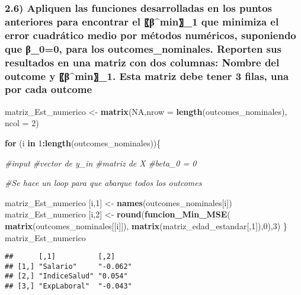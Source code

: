 \documentclass[
]{article}
\newenvironment{Shaded}{\begin{snugshade}}{\end{snugshade}}
\newcommand{\AttributeTok}[1]{\textcolor[rgb]{0.13,0.29,0.53}{#1}}
\newcommand{\CommentTok}[1]{\textcolor[rgb]{0.56,0.35,0.01}{\textit{#1}}}
\newcommand{\ConstantTok}[1]{\textcolor[rgb]{0.56,0.35,0.01}{#1}}
\newcommand{\ControlFlowTok}[1]{\textcolor[rgb]{0.13,0.29,0.53}{\textbf{#1}}}
\newcommand{\DecValTok}[1]{\textcolor[rgb]{0.00,0.00,0.81}{#1}}
\newcommand{\FunctionTok}[1]{\textcolor[rgb]{0.13,0.29,0.53}{\textbf{#1}}}
\newcommand{\NormalTok}[1]{#1}
\newcommand{\OtherTok}[1]{\textcolor[rgb]{0.56,0.35,0.01}{#1}}
\newcommand{\SpecialCharTok}[1]{\textcolor[rgb]{0.81,0.36,0.00}{\textbf{#1}}}
\begin{document}
\hypertarget{apliquen-las-funciones-desarrolladas-en-los-puntos-anteriores-para-encontrar-el-ux3b2min_1-que-minimiza-el-error-cuadruxe1tico-medio-por-muxe9todos-numuxe9ricos-suponiendo-que-ux3b2_00-para-los-outcomes_nominales.-reporten-sus-resultados-en-una-matriz-con-dos-columnas-nombre-del-outcome-y-ux3b2min_1.-esta-matriz-debe-tener-3-filas-una-por-cada-outcome}{%
\subsubsection{2.6) Apliquen las funciones desarrolladas en los puntos
anteriores para encontrar el 〖β\^{}min〗\_1 que minimiza el error
cuadrático medio por métodos numéricos, suponiendo que β\_0=0, para los
outcomes\_nominales. Reporten sus resultados en una matriz con dos
columnas: Nombre del outcome y 〖β\^{}min〗\_1. Esta matriz debe tener 3
filas, una por cada
outcome}\label{apliquen-las-funciones-desarrolladas-en-los-puntos-anteriores-para-encontrar-el-ux3b2min_1-que-minimiza-el-error-cuadruxe1tico-medio-por-muxe9todos-numuxe9ricos-suponiendo-que-ux3b2_00-para-los-outcomes_nominales.-reporten-sus-resultados-en-una-matriz-con-dos-columnas-nombre-del-outcome-y-ux3b2min_1.-esta-matriz-debe-tener-3-filas-una-por-cada-outcome}}

\begin{Shaded}
\begin{Highlighting}[]
\NormalTok{matriz\_Est\_numerico }\OtherTok{\textless{}{-}} \FunctionTok{matrix}\NormalTok{(}\ConstantTok{NA}\NormalTok{,}\AttributeTok{nrow =} \FunctionTok{length}\NormalTok{(outcomes\_nominales),}
                                 \AttributeTok{ncol =} \DecValTok{2}\NormalTok{)}

\ControlFlowTok{for}\NormalTok{ (i }\ControlFlowTok{in} \DecValTok{1}\SpecialCharTok{:}\FunctionTok{length}\NormalTok{(outcomes\_nominales))\{}
  
  \CommentTok{\#input}
    \CommentTok{\#vector de y\_in}
    \CommentTok{\#matriz de X}
    \CommentTok{\#beta\_0 = 0}
  
  \CommentTok{\#Se hace un loop para que abarque todos los outcomes}
  
\NormalTok{  matriz\_Est\_numerico [i,}\DecValTok{1}\NormalTok{] }\OtherTok{\textless{}{-}} \FunctionTok{names}\NormalTok{(outcomes\_nominales[i])}
\NormalTok{  matriz\_Est\_numerico [i,}\DecValTok{2}\NormalTok{] }\OtherTok{\textless{}{-}} \FunctionTok{round}\NormalTok{(}\FunctionTok{funcion\_Min\_MSE}\NormalTok{(}
                                \FunctionTok{matrix}\NormalTok{(outcomes\_nominales[[i]]),}
                                \FunctionTok{matrix}\NormalTok{(matriz\_edad\_estandar[,}\DecValTok{1}\NormalTok{]),}\DecValTok{0}\NormalTok{),}\DecValTok{3}\NormalTok{)}
\NormalTok{\}}
\NormalTok{matriz\_Est\_numerico}
\end{Highlighting}
\end{Shaded}

\begin{verbatim}
##      [,1]          [,2]    
## [1,] "Salario"     "-0.062"
## [2,] "IndiceSalud" "0.054" 
## [3,] "ExpLaboral"  "-0.043"
\end{verbatim}
\end{document}
